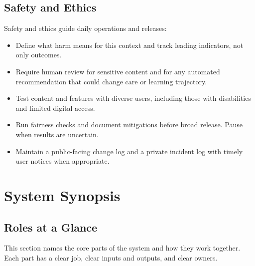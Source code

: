 \documentclass[12pt]{article}
\begin{document}
\subsection*{Safety and Ethics}
Safety and ethics guide daily operations and releases:
\begin{itemize}[leftmargin=*]
  \item Define what harm means for this context and track leading indicators, not only outcomes.
  \item Require human review for sensitive content and for any automated recommendation that could change care or learning trajectory.
  \item Test content and features with diverse users, including those with disabilities and limited digital access.
  \item Run fairness checks and document mitigations before broad release. Pause when results are uncertain.
  \item Maintain a public-facing change log and a private incident log with timely user notices when appropriate.
\end{itemize}


\section{System Synopsis}

\subsection*{Roles at a Glance}
This section names the core parts of the system and how they work together. Each part has a clear job, clear inputs and outputs, and clear owners.
\end{document}

